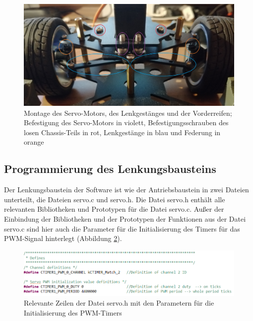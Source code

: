 \begin{figure}[H] %
\includegraphics[width=.90\textwidth]{sec5/images/MontageLenkungskomponenten} 
\centering
\captionsetup{width=.95\textwidth}
\caption[Montage der Lenkungskomponenten]{Montage des Servo-Motors, des Lenkgestänges und der Vorderreifen; Befestigung des Servo-Motors in violett, Befestigungsschrauben des losen Chassis-Teils in rot, Lenkgestänge in blau und Federung in orange}\centering
\label{fig:MontageLenkungskomponenten}
\end{figure}

\newpage
\subsection{Programmierung des Lenkungsbausteins}\label{Sec5Sub3}

Der Lenkungsbaustein der Software ist wie der Antriebsbaustein in zwei Dateien unterteilt, die Dateien \glqq{}servo.c\grqq{} und  \glqq{}servo.h\grqq{}. Die Datei \glqq{}servo.h\grqq{} enthält alle relevanten Bibliotheken und Prototypen für die Datei \glqq{}servo.c\grqq{}. Außer der Einbindung der Bibliotheken und der Prototypen der Funktionen aus der Datei \glqq{}servo.c\grqq{} sind hier auch die Parameter für die Initialisierung des Timers für das \ac{PWM}-Signal hinterlegt (Abbildung \ref{fig:ServoH}). 

\begin{figure}[H] %
\includegraphics[width=.90\textwidth]{sec5/images/ServoH} 
\centering
\captionsetup{width=.95\textwidth}
\caption[Relevante Zeilen der Datei \glqq{}servo.h\grqq{}]{Relevante Zeilen der Datei \glqq{}servo.h\grqq{} mit den Parametern für die Initialisierung des \ac{PWM}-Timers}\centering
\label{fig:ServoH}
\end{figure}

